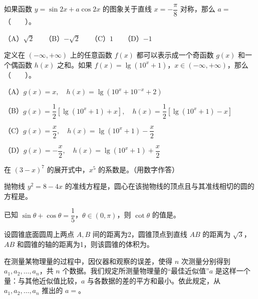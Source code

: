 \begin{question}
如果函数 $y=\sin2x+a\cos2x$ 的图象关于直线 $x=-\dfrac\pi8$ 对称，那么 $a=$\mbox{（　　）}。

（A）$\sqrt2$　　（B）$-\sqrt2$　　（C）$1$　　（D）$-1$

\end{question}
\begin{question}
定义在 $(-\infty,+\infty)$ 上的任意函数 $f(x)$ 都可以表示成一个奇函数 $g(x)$ 和一个偶函数 $h(x)$ 之和。如果 $f(x)=\lg(10^x+1)$，$x\in(-\infty,+\infty)$，那么\mbox{（　　）}。

（A）$g(x)=x,\quad h(x)=\lg(10^x+10^{-x}+2)$

（B）$g(x)=\dfrac12[\lg(10^x+1)+x],\quad h(x)=\dfrac12[\lg(10^x+1)-x]$

（C）$g(x)=\dfrac{x}{2},\quad h(x)=\lg(10^x+1)-\dfrac{x}{2}$

（D）$g(x)=-\dfrac{x}{2},\quad h(x)=\lg(10^x+1)+\dfrac{x}{2}$

\end{question}
\begin{question}
在 $(3-x)^7$ 的展开式中，$x^5$ 的系数是\underline{\qquad\qquad}。（用数字作答）

\end{question}
\begin{question}
抛物线 $y^2=8-4x$ 的准线方程是\underline{\qquad\qquad}，圆心在该抛物线的顶点且与其准线相切的圆的方程是\underline{\qquad\qquad}。

\end{question}
\begin{question}
已知 $\sin\theta+\cos\theta=\dfrac15$，$\theta\in(0,\pi)$，则 $\cot\theta$ 的值是\underline{\qquad\qquad}。

\end{question}
\begin{question}
设圆锥底面圆周上两点 $A,B$ 间的距离为2，圆锥顶点到直线 $AB$ 的距离为 $\sqrt3$，$AB$ 和圆锥的轴的距离为1，则该圆锥的体积为\underline{\qquad\qquad}。

\end{question}
\begin{question}
在测量某物理量的过程中，因仪器和观察的误差，使得 $n$ 次测量分别得到 $a_1,a_2,\ldots,a_n$，共 $n$ 个数据。我们规定所测量物理量的“最佳近似值”$a$ 是这样一个量：与其他近似值比较，$a$ 与各数据的差的平方和最小。依此规定，从 $a_1,a_2,\ldots,a_n$ 推出的 $a=$\underline{\qquad\qquad}。

\end{question}
